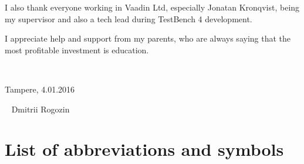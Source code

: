\documentclass[12pt,a4paper,english%
]{tutthesis}
\begin{document}
I also thank everyone working in Vaadin Ltd, especially Jonatan Kronqvist,
being my supervisor and also a tech lead during TestBench 4 development.

I appreciate help and support from my parents, who are always saying that
the most profitable investment is education.

~ 

Tampere, 4.01.2016

~
Dmitrii Rogozin
%
%

\renewcommand\contentsname{Table of Contents} %
\setcounter{tocdepth}{3}                      %
\tableofcontents                              %

\renewcommand\listfigurename{List of Figures}  %
\listoffigures                                 %
\markboth{}{}                                  %

\renewcommand\listtablename{List of Tables}    %
\listoftables                                  %
\markboth{}{}                                  %




%
%

\chapter*{List of abbreviations and symbols}
\markboth{}{}                                %
\end{document}

